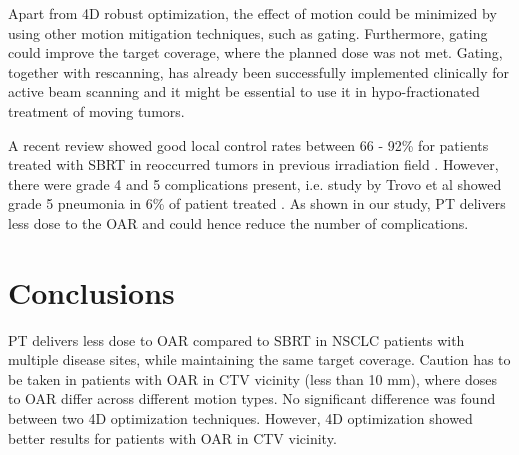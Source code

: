 \documentclass[type=dr, dr=rernat, accentcolor=tud7b,colorbacktitle, bigchapter, openright, twoside, 12pt ]{tudthesis}
\begin{document}
Apart from 4D robust optimization, the effect of motion could be minimized by using other motion mitigation techniques, such as gating. Furthermore, gating could improve the target coverage, where the planned dose was
not met. Gating, together with rescanning, has already been successfully implemented clinically for active beam scanning \cite{Rossi2016, Mori2016} and it might be essential to use it in hypo-fractionated 
treatment of moving tumors.

A recent review showed good local control rates between 66 - 92\% for patients treated with SBRT in reoccurred tumors in previous irradiation field \cite{Amini2014}. 
However, there were grade 4 and 5 complications present, i.e. study by Trovo et al showed grade 5 pneumonia in
6\% of patient treated \cite{Trovo2014}. As shown in our study, PT delivers less dose to the OAR and could hence reduce the number of complications.

\section{Conclusions}

PT delivers less dose to OAR compared to SBRT in NSCLC patients with multiple disease sites, while maintaining the same target coverage. 
Caution has to be taken in patients with OAR in CTV vicinity (less than 10 mm), where doses to OAR differ across different motion types.
No significant difference was found between two 4D optimization techniques. However, 4D optimization showed better results for patients with OAR in CTV vicinity.





{}
% 
\end{document}
